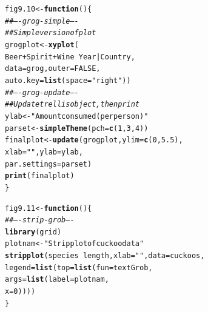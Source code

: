 \documentclass[12pt, a4paper,  BCOR=8.25mm, DIV=15]{scrartcl}\usepackage[]{graphicx}\usepackage[]{color}
\makeatletter
\newcommand{\hlnum}[1]{\textcolor[rgb]{0.686,0.059,0.569}{#1}}%
\newcommand{\hlstr}[1]{\textcolor[rgb]{0.192,0.494,0.8}{#1}}%
\newcommand{\hlcom}[1]{\textcolor[rgb]{0.678,0.584,0.686}{\textit{#1}}}%
\newcommand{\hlopt}[1]{\textcolor[rgb]{0,0,0}{#1}}%
\newcommand{\hlstd}[1]{\textcolor[rgb]{0.345,0.345,0.345}{#1}}%
\newcommand{\hlkwa}[1]{\textcolor[rgb]{0.161,0.373,0.58}{\textbf{#1}}}%
\newcommand{\hlkwb}[1]{\textcolor[rgb]{0.69,0.353,0.396}{#1}}%
\newcommand{\hlkwc}[1]{\textcolor[rgb]{0.333,0.667,0.333}{#1}}%
\newcommand{\hlkwd}[1]{\textcolor[rgb]{0.737,0.353,0.396}{\textbf{#1}}}%
\newenvironment{kframe}{%
 \def\at@end@of@kframe{}%
 \ifinner\ifhmode%
  \def\at@end@of@kframe{\end{minipage}}%
  \begin{minipage}{\columnwidth}%
 \fi\fi%
 \def\FrameCommand##1{\hskip\@totalleftmargin \hskip-\fboxsep
 \colorbox{shadecolor}{##1}\hskip-\fboxsep
     \hskip-\linewidth \hskip-\@totalleftmargin \hskip\columnwidth}%
 \MakeFramed {\advance\hsize-\width
   \@totalleftmargin\z@ \linewidth\hsize
   \@setminipage}}%
 {\par\unskip\endMakeFramed%
 \at@end@of@kframe}
\newenvironment{knitrout}{}{} %
\makeatother
\begin{document}
\begin{knitrout}
\color{fgcolor}\begin{kframe}
\begin{alltt}
\hlstd{fig9.10} \hlkwb{<-} \hlkwa{function}\hlstd{()\{}
\hlcom{## ---- grog-simple ----}
\hlcom{## Simple version of plot}
\hlstd{grogplot} \hlkwb{<-} \hlkwd{xyplot}\hlstd{(}
              \hlstd{Beer}\hlopt{+}\hlstd{Spirit}\hlopt{+}\hlstd{Wine} \hlopt{~} \hlstd{Year} \hlopt{|} \hlstd{Country,}
              \hlkwc{data}\hlstd{=grog,} \hlkwc{outer}\hlstd{=}\hlnum{FALSE}\hlstd{,}
              \hlkwc{auto.key}\hlstd{=}\hlkwd{list}\hlstd{(}\hlkwc{space}\hlstd{=}\hlstr{"right"}\hlstd{))}
\hlcom{## ---- grog-update ----}
\hlcom{## Update trellis object, then print}
\hlstd{ylab} \hlkwb{<-} \hlstr{"Amount consumed (per person)"}
\hlstd{parset} \hlkwb{<-} \hlkwd{simpleTheme}\hlstd{(}\hlkwc{pch}\hlstd{=}\hlkwd{c}\hlstd{(}\hlnum{1}\hlstd{,}\hlnum{3}\hlstd{,}\hlnum{4}\hlstd{))}
\hlstd{finalplot} \hlkwb{<-} \hlkwd{update}\hlstd{(grogplot,} \hlkwc{ylim}\hlstd{=}\hlkwd{c}\hlstd{(}\hlnum{0}\hlstd{,}\hlnum{5.5}\hlstd{),}
                     \hlkwc{xlab}\hlstd{=}\hlstr{""}\hlstd{,} \hlkwc{ylab}\hlstd{=ylab,}
                     \hlkwc{par.settings}\hlstd{=parset)}
\hlkwd{print}\hlstd{(finalplot)}
\hlstd{\}}
\end{alltt}
\end{kframe}
\end{knitrout}

\begin{knitrout}
\color{fgcolor}\begin{kframe}
\begin{alltt}
\hlstd{fig9.11} \hlkwb{<-} \hlkwa{function}\hlstd{()\{}
\hlcom{## ---- strip-grob ----}
\hlkwd{library}\hlstd{(grid)}
\hlstd{plotnam} \hlkwb{<-} \hlstr{"Stripplot of cuckoo data"}
\hlkwd{stripplot}\hlstd{(species} \hlopt{~} \hlstd{length,} \hlkwc{xlab}\hlstd{=}\hlstr{""}\hlstd{,} \hlkwc{data}\hlstd{=cuckoos,}
  \hlkwc{legend}\hlstd{=}\hlkwd{list}\hlstd{(}\hlkwc{top}\hlstd{=}\hlkwd{list}\hlstd{(}\hlkwc{fun}\hlstd{=textGrob,}
                       \hlkwc{args}\hlstd{=}\hlkwd{list}\hlstd{(}\hlkwc{label}\hlstd{=plotnam,}
                                 \hlkwc{x}\hlstd{=}\hlnum{0}\hlstd{))))}
\hlstd{\}}
\end{alltt}
\end{kframe}
\end{knitrout}
\end{document}

